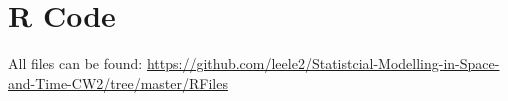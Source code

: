 \appendix
\gdef\thesection{Appendix \Alph{section}:}
\section{R Code}

All files can be found: \small{\url{https://github.com/leele2/Statistcial-Modelling-in-Space-and-Time-CW2/tree/master/RFiles}}







